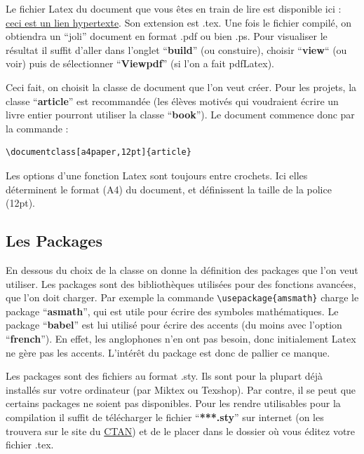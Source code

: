 \documentclass[a4paper,10pt]{article}
\begin{document}
Le fichier Latex du document que vous êtes en train de lire est  disponible ici : \href{http://people.math.jussieu.fr/~salmon/enseignement/M1/introlatex.tex}{ceci est un lien hypertexte}.  Son extension est  .tex. Une fois le fichier compilé,  on obtiendra un ``joli'' document en format .pdf ou bien .ps. Pour visualiser le résultat il suffit d'aller dans l'onglet  ``\textbf{build}'' (ou constuire), choisir ``\textbf{view}`` (ou voir) puis de sélectionner ``\textbf{Viewpdf}'' (si l'on a fait pdfLatex).\medskip

Ceci fait, on choisit la classe de document  que l'on veut créer.  Pour les projets,  la classe ``\textbf{article}'' est recommandée (les élèves motivés qui voudraient écrire un livre entier pourront utiliser la classe ``\textbf{book}''). Le document commence donc par la commande :\medskip

\begin{lstlisting}
\documentclass[a4paper,12pt]{article}
\end{lstlisting}

Les options d'une fonction Latex sont toujours entre crochets. Ici elles déterminent le format (A4) du document, et définissent la taille de la police (12pt).\medskip
\subsection{Les Packages}

En dessous du choix de la classe on donne la définition des packages que l'on veut utiliser. Les packages sont des bibliothèques utilisées pour des fonctions avancées, que l'on doit charger. Par exemple la commande  \lstinline+\usepackage{amsmath}+ charge le package ``\textbf{asmath}'', qui est utile  pour écrire des symboles mathématiques. Le package ``\textbf{babel}''  est lui utilisé pour écrire des accents (du moins avec l'option ``\textbf{french}''). En effet, les anglophones n'en ont pas besoin, donc initialement Latex ne gère pas les accents. L'intérêt du package est donc de pallier ce manque. \medskip

Les packages sont des fichiers au format .sty. Ils sont pour la plupart déjà installés sur votre ordinateur (par Miktex ou Texshop). Par contre, il se peut que certains packages ne soient pas disponibles.  Pour les rendre utilisables pour la compilation il suffit de télécharger le fichier ``\textbf{***.sty}''  sur internet (on les trouvera sur le site du  \href{http://www.ctan.org/}{CTAN})  et de le placer dans le dossier où vous éditez votre fichier .tex.     \medskip
\end{document}
